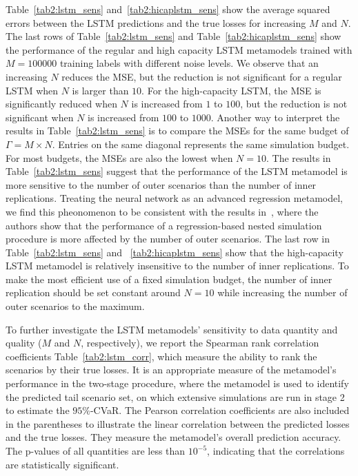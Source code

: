 Table~\ref{tab2:lstm_sens} and~\ref{tab2:hicaplstm_sens} show the average squared errors between the LSTM predictions and the true losses for increasing $M$ and $N$.
The last rows of Table~\ref{tab2:lstm_sens} and Table~\ref{tab2:hicaplstm_sens} show the performance of the regular and high capacity LSTM metamodels trained with $M=\num{100000}$ training labels with different noise levels.
We observe that an increasing $N$ reduces the MSE, but the reduction is not significant for a regular LSTM when $N$ is larger than $10$.
For the high-capacity LSTM, the MSE is significantly reduced when $N$ is increased from $1$ to $100$, but the reduction is not significant when $N$ is increased from $100$ to $\num{1000}$.
Another way to interpret the results in Table~\ref{tab2:lstm_sens} is to compare the MSEs for the same budget of $\Gamma = M \times N$. 
Entries on the same diagonal represents the same simulation budget.
For most budgets, the MSEs are also the lowest when $N = 10$.
The results in Table~\ref{tab2:lstm_sens} suggest that the performance of the LSTM metamodel is more sensitive to the number of outer scenarios than the number of inner replications.
Treating the neural network as an advanced regression metamodel, we find this pheonomenon to be consistent with the results in~\cite{broadie2015risk}, where the authors show that the performance of a regression-based nested simulation procedure is more affected by the number of outer scenarios.
The last row in Table~\ref{tab2:lstm_sens} and ~\ref{tab2:hicaplstm_sens} show that the high-capacity LSTM metamodel is relatively insensitive to the number of inner replications.
To make the most efficient use of a fixed simulation budget, the number of inner replication should be set constant around $N=10$ while increasing the number of outer scenarios to the maximum.

To further investigate the LSTM metamodels' sensitivity to data quantity and quality ($M$ and $N$, respectively), we report the Spearman rank correlation coefficients Table~\ref{tab2:lstm_corr}, which measure the ability to rank the scenarios by their true losses.
It is an appropriate measure of the metamodel's performance in the two-stage procedure, where the metamodel is used to identify the predicted tail scenario set, on which extensive simulations are run in stage 2 to estimate the $95\%$-CVaR.
The Pearson correlation coefficients are also included in the parentheses to illustrate the linear correlation between the predicted losses and the true losses.
They measure the metamodel's overall prediction accuracy.
The p-values of all quantities are less than $10^{-5}$, indicating that the correlations are statistically significant.


